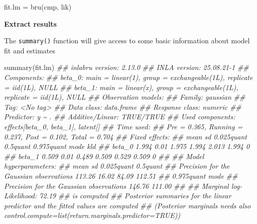 \documentclass[
  letterpaper,
  DIV=11,
  numbers=noendperiod]{scrartcl}
\newenvironment{Shaded}{\begin{snugshade}}{\end{snugshade}}
\newcommand{\DocumentationTok}[1]{\textcolor[rgb]{0.37,0.37,0.37}{\textit{#1}}}
\newcommand{\FunctionTok}[1]{\textcolor[rgb]{0.28,0.35,0.67}{#1}}
\newcommand{\NormalTok}[1]{\textcolor[rgb]{0.00,0.23,0.31}{#1}}
\newcommand{\OtherTok}[1]{\textcolor[rgb]{0.00,0.23,0.31}{#1}}
\begin{document}
\begin{Shaded}
\begin{Highlighting}[]
\NormalTok{fit.lm }\OtherTok{=} \FunctionTok{bru}\NormalTok{(cmp, lik)}
\end{Highlighting}
\end{Shaded}

\textbf{Extract results}

The \texttt{summary()} function will give access to some basic
information about model fit and estimates

\begin{Shaded}
\begin{Highlighting}[]
\FunctionTok{summary}\NormalTok{(fit.lm)}
\DocumentationTok{\#\# inlabru version: 2.13.0}
\DocumentationTok{\#\# INLA version: 25.08.21{-}1}
\DocumentationTok{\#\# Components:}
\DocumentationTok{\#\# beta\_0: main = linear(1), group = exchangeable(1L), replicate = iid(1L), NULL}
\DocumentationTok{\#\# beta\_1: main = linear(x), group = exchangeable(1L), replicate = iid(1L), NULL}
\DocumentationTok{\#\# Observation models:}
\DocumentationTok{\#\#   Family: \textquotesingle{}gaussian\textquotesingle{}}
\DocumentationTok{\#\#     Tag: \textless{}No tag\textgreater{}}
\DocumentationTok{\#\#     Data class: \textquotesingle{}data.frame\textquotesingle{}}
\DocumentationTok{\#\#     Response class: \textquotesingle{}numeric\textquotesingle{}}
\DocumentationTok{\#\#     Predictor: y \textasciitilde{} .}
\DocumentationTok{\#\#     Additive/Linear: TRUE/TRUE}
\DocumentationTok{\#\#     Used components: effects[beta\_0, beta\_1], latent[]}
\DocumentationTok{\#\# Time used:}
\DocumentationTok{\#\#     Pre = 0.365, Running = 0.237, Post = 0.102, Total = 0.704 }
\DocumentationTok{\#\# Fixed effects:}
\DocumentationTok{\#\#         mean   sd 0.025quant 0.5quant 0.975quant  mode kld}
\DocumentationTok{\#\# beta\_0 1.994 0.01      1.975    1.994      2.013 1.994   0}
\DocumentationTok{\#\# beta\_1 0.509 0.01      0.489    0.509      0.529 0.509   0}
\DocumentationTok{\#\# }
\DocumentationTok{\#\# Model hyperparameters:}
\DocumentationTok{\#\#                                           mean    sd 0.025quant 0.5quant}
\DocumentationTok{\#\# Precision for the Gaussian observations 113.26 16.02      84.09   112.51}
\DocumentationTok{\#\#                                         0.975quant   mode}
\DocumentationTok{\#\# Precision for the Gaussian observations     146.76 111.00}
\DocumentationTok{\#\# }
\DocumentationTok{\#\# Marginal log{-}Likelihood:  72.19 }
\DocumentationTok{\#\#  is computed }
\DocumentationTok{\#\# Posterior summaries for the linear predictor and the fitted values are computed}
\DocumentationTok{\#\# (Posterior marginals needs also \textquotesingle{}control.compute=list(return.marginals.predictor=TRUE)\textquotesingle{})}
\end{Highlighting}
\end{Shaded}
\end{document}
